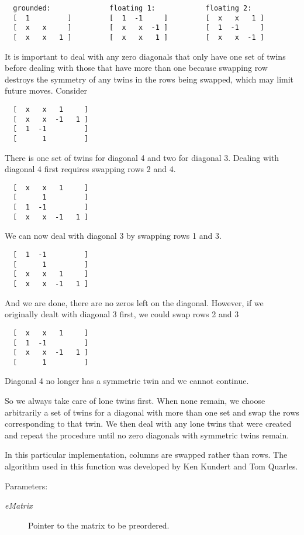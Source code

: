 \footnotesize\begin{verbatim}  grounded:              floating 1:            floating 2:
  [  1         ]         [  1  -1     ]         [  x   x   1 ]
  [  x   x     ]         [  x   x  -1 ]         [  1  -1     ]
  [  x   x   1 ]         [  x   x   1 ]         [  x   x  -1 ]
\end{verbatim}\normalsize 


It is important to deal with any zero diagonals that only have one set of twins before dealing with those that have more than one because swapping row destroys the symmetry of any twins in the rows being swapped, which may limit future moves. Consider 

\footnotesize\begin{verbatim}  [  x   x   1     ]
  [  x   x  -1   1 ]
  [  1  -1         ]
  [      1         ]
\end{verbatim}\normalsize 
 There is one set of twins for diagonal 4 and two for diagonal 3. Dealing with diagonal 4 first requires swapping rows 2 and 4. 

\footnotesize\begin{verbatim}  [  x   x   1     ]
  [      1         ]
  [  1  -1         ]
  [  x   x  -1   1 ]
\end{verbatim}\normalsize 
 We can now deal with diagonal 3 by swapping rows 1 and 3. 

\footnotesize\begin{verbatim}  [  1  -1         ]
  [      1         ]
  [  x   x   1     ]
  [  x   x  -1   1 ]
\end{verbatim}\normalsize 
 And we are done, there are no zeros left on the diagonal. However, if we originally dealt with diagonal 3 first, we could swap rows 2 and 3 

\footnotesize\begin{verbatim}  [  x   x   1     ]
  [  1  -1         ]
  [  x   x  -1   1 ]
  [      1         ]
\end{verbatim}\normalsize 
 Diagonal 4 no longer has a symmetric twin and we cannot continue.

So we always take care of lone twins first. When none remain, we choose arbitrarily a set of twins for a diagonal with more than one set and swap the rows corresponding to that twin. We then deal with any lone twins that were created and repeat the procedure until no zero diagonals with symmetric twins remain.

In this particular implementation, columns are swapped rather than rows. The algorithm used in this function was developed by Ken Kundert and Tom Quarles.\begin{Desc}
\item[Parameters: ]\par
\begin{description}
\item[{\em 
e\-Matrix}]Pointer to the matrix to be preordered. \end{description}
\end{Desc}
